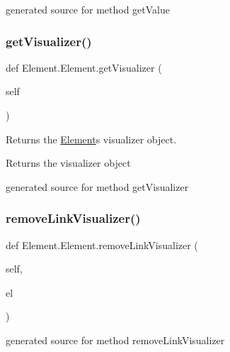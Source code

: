 \begin{DoxyVerb}generated source for method getValue \end{DoxyVerb}
 \hypertarget{class_element_1_1_element_a83844b6ce0a822dfb09b4cdd16691ac5}{}\label{class_element_1_1_element_a83844b6ce0a822dfb09b4cdd16691ac5} 
\subsubsection{\texorpdfstring{get\+Visualizer()}{getVisualizer()}}
{\footnotesize\ttfamily def Element.\+Element.\+get\+Visualizer (\begin{DoxyParamCaption}\item[{}]{self }\end{DoxyParamCaption})}



Returns the \hyperlink{class_element_1_1_element}{Element}\textquotesingle{}s visualizer object. 

\begin{DoxyReturn}{Returns}
the visualizer object\begin{DoxyVerb}generated source for method getVisualizer \end{DoxyVerb}
 
\end{DoxyReturn}
\hypertarget{class_element_1_1_element_a2dde72f6339b9d052df50bb4a5de2502}{}\label{class_element_1_1_element_a2dde72f6339b9d052df50bb4a5de2502} 
\subsubsection{\texorpdfstring{remove\+Link\+Visualizer()}{removeLinkVisualizer()}}
{\footnotesize\ttfamily def Element.\+Element.\+remove\+Link\+Visualizer (\begin{DoxyParamCaption}\item[{}]{self,  }\item[{}]{el }\end{DoxyParamCaption})}

\begin{DoxyVerb}generated source for method removeLinkVisualizer \end{DoxyVerb}
 \hypertarget{class_element_1_1_element_a21af17ef037212f8ab693ec66952e4ac}{}\label{class_element_1_1_element_a21af17ef037212f8ab693ec66952e4ac} 
